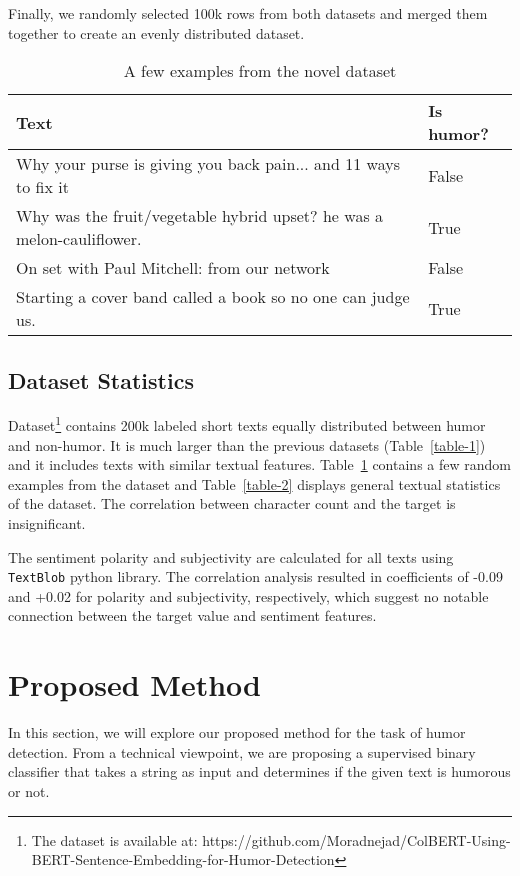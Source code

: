 \documentclass{article}
\begin{document}
Finally, we randomly selected 100k rows from both datasets and merged them together to create an evenly distributed dataset.

\begin{table}
  \caption{A few examples from the novel dataset}
  \label{table-exa}
  \centering
  \begin{tabular}{p{8cm}|l}
  \hline
Text & Is humor?    \\ \hline
Why your purse is giving you back pain... and 11 ways to fix it & False \\
Why was the fruit/vegetable hybrid upset? he was a melon-cauliflower. & True \\
On set with Paul Mitchell: from our network & False \\
Starting a cover band called a book so no one can judge us. & True \\

\hline
  \end{tabular}
\end{table}


\subsection{Dataset Statistics}

Dataset\footnote{The dataset is available at: https://github.com/Moradnejad/ColBERT-Using-BERT-Sentence-Embedding-for-Humor-Detection} contains 200k labeled short texts equally distributed between humor and non-humor. It is much larger than the previous datasets (Table~\ref{table-1}) and it includes texts with similar textual features. Table~\ref{table-exa} contains a few random examples from the dataset and Table~\ref{table-2} displays general textual statistics of the dataset. The correlation between character count and the target is insignificant. 

The sentiment polarity and subjectivity are calculated for all texts using \verb+TextBlob+ python library. The correlation analysis resulted in coefficients of -0.09 and +0.02 for polarity and subjectivity, respectively, which suggest no notable connection between the target value and sentiment features.

\section{Proposed Method}
In this section, we will explore our proposed method for the task of humor detection. From a technical viewpoint, we are proposing a supervised binary classifier that takes a string as input and determines if the given text is humorous or not.
\end{document}
